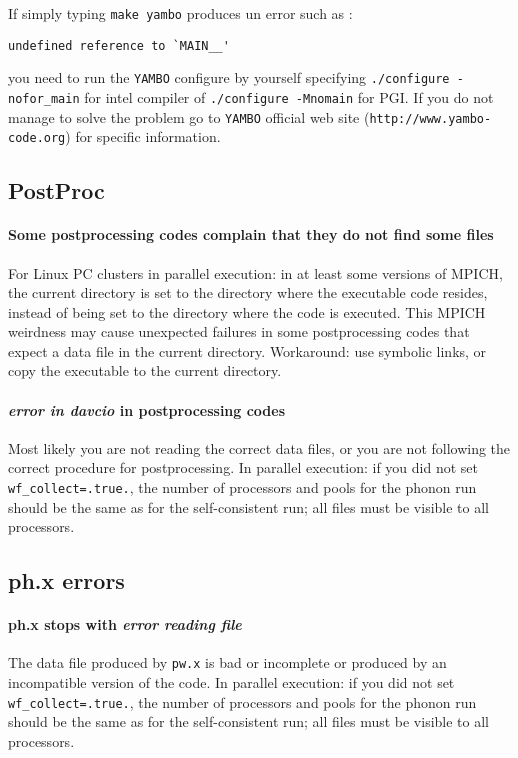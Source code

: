 \documentclass[12pt,a4paper]{article}
\def\pw.x{\texttt{pw.x}}
\begin{document}
If simply typing \texttt{make yambo} produces un error such as : 
\begin{verbatim}
undefined reference to `MAIN__'
\end{verbatim}
you need to run the \texttt{YAMBO} configure by yourself specifying 
\texttt{./configure -nofor\_main} for intel compiler of \texttt{./configure -Mnomain} 
for PGI. If you do not manage to solve
the problem go to \texttt{YAMBO} official web site (\texttt{http://www.yambo-code.org}) for 
specific information.

\subsection{PostProc}

\paragraph{Some postprocessing codes complain that they do not find some files}
For Linux PC clusters in parallel execution: in at least some versions
of MPICH, the current directory is set to the directory where the executable
code resides, instead of being set to the directory where the code is executed.
This MPICH weirdness may cause unexpected failures in some postprocessing
codes that expect a data file in the current directory. Workaround: use
symbolic links, or copy the executable to the current directory.

\paragraph{{\em error in davcio} in postprocessing codes}
Most likely you are not reading the correct data files, or you are not
following the correct procedure for postprocessing. In parallel execution: 
if you did not set \texttt{wf\_collect=.true.}, the number of processors and 
pools for the phonon run should be the same as for the
self-consistent run; all files must be visible to all processors.

\subsection{ph.x errors}

\paragraph{ph.x stops with {\em error reading file}}
The data file produced by \pw.x
is bad or incomplete or produced by an incompatible version of the code.
In parallel execution: if you did not set \texttt{wf\_collect=.true.}, the number
of processors and pools for the phonon run should be the same as for the
self-consistent run; all files must be visible to all processors.
\end{document}
